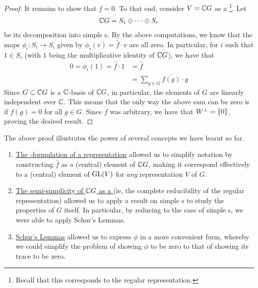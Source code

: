 \begin{proof}
    It remains to show that $f = 0$. To that end, consider $V = \mathbb{C} G$ as a \CGM\footnote{Recall that this corresponds to the regular representation.}. Let
    \begin{align*}
        \mathbb{C} G = S_1 \oplus \cdots \oplus S_r
    \end{align*}
    be its decomposition into simple \CGM s. By the above computations, we know that the maps $\phi_i : S_i \to S_i$ given by $\phi_i(v) = \hat{f} \cdot v$ are all zero. In particular, for $i$ such that $1 \in S_i$ (with $1$ being the multiplicative identity of $\mathbb{C} G$), we have that
    \begin{align*}
        0 = \phi_i(1) = \hat{f} \cdot 1 &= \hat{f} \\
        &= \sum_{g \in G} \overline{f(g)} \cdot g
    \end{align*}
    Since $G \subset \mathbb{C} G$ is a $\mathbb{C}$-basis of $\mathbb{C} G$, in particular, the elements of $G$ are linearly independent over $\mathbb{C}$. This means that the only way the above sum can be zero is if $\bar{f(g)} = 0$ for all $g \in G$. Since $f$ was arbitrary, we have that $W^\perp = \left\{ 0 \right\}$, proving the desired result.
\end{proof}

\begin{remark}
    The above proof illustrates the power of several concepts we have learnt so far.
    \begin{enumerate}
        \item \underline{The \CGM-formulation of a representation} allowed us to simplify notation by constructing $\hat{f}$ as a (central) element of $\mathbb{C} G$, making it correspond effectively to a (central) element of $\operatorname{GL}\!\left( V \right)$ for \textit{any} representation $V$ of $G$.
        \item \underline{The semi-simplicity of $\mathbb{C} G$ as a \CGM} (ie, the complete reducibility of the regular representation) allowed us to apply a result on simple \CGM s to study the properties of $G$ itself. In particular, by reducing to the case of simple \CGM s, we were able to apply Schur's Lemmas.
        \item \underline{Schur's Lemmas} allowed us to express $\phi$ in a more convenient form, whereby we could simplify the problem of showing $\phi$ to be zero to that of showing its trace to be zero.
    \end{enumerate}
\end{remark}


